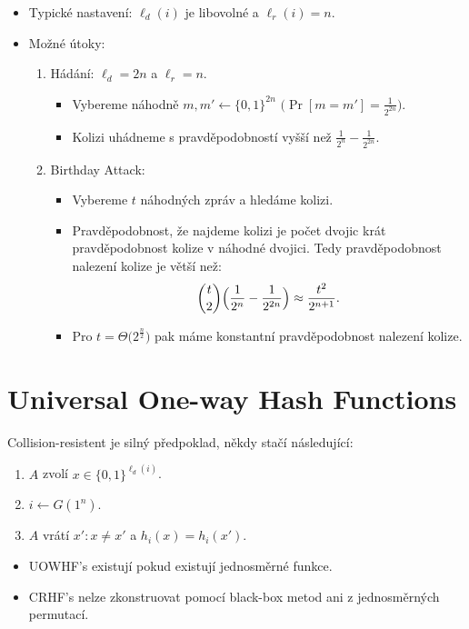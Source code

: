 \documentclass{article}
\begin{document}
\begin{itemize}
\item Typické nastavení: $\ell_d(i)$ je libovolné a $\ell_r(i) = n$.
\item Možné útoky:
\begin{enumerate}
\item Hádání: $\ell_d = 2n$ a $\ell_r = n$.
\begin{itemize}
\item Vybereme náhodně $m,m' \leftarrow \{0,1\}^{2n}$ $\bigl(\Pr[m = m'] = \frac{1}{2^{2n}}\bigr)$.
\item Kolizi uhádneme s pravděpodobností vyšší než $\frac{1}{2^n} - \frac{1}{2^{2n}}$.
\end{itemize}
\item Birthday Attack:
\begin{itemize}
\item Vybereme $t$ náhodných zpráv a hledáme kolizi.
\item Pravděpodobnost, že najdeme kolizi je počet dvojic krát pravděpodobnost kolize v náhodné dvojici. Tedy pravděpodobnost nalezení kolize je větší než:
\[
\binom{t}{2} \Bigl(\frac{1}{2^n} - \frac{1}{2^{2n}}\Bigr) \approx \frac{t^2}{2^{n+1}}.
\]
\item Pro $t = \Theta\bigl(2^{\frac{n}{2}}\bigr)$ pak máme konstantní pravděpodobnost nalezení kolize.
\end{itemize}
\end{enumerate}
\end{itemize}

\section{Universal One-way Hash Functions}
\noindent Collision-resistent je silný předpoklad, někdy stačí následující:
\begin{enumerate}
\item $A$ zvolí $x \in \{0,1\}^{\ell_d(i)}$.
\item $i \leftarrow G(1^n)$.
\item $A$ vrátí $x': x \neq x'$ a $h_i(x) = h_i(x')$.
\end{enumerate}
\begin{itemize}
\item UOWHF's existují pokud existují jednosměrné funkce.
\item CRHF's nelze zkonstruovat pomocí black-box metod ani z jednosměrných permutací.
\end{itemize}
\end{document}
